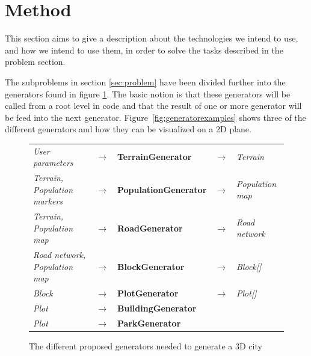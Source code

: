 \section{Method}
This section aims to give a description about the technologies we intend to use, and how we intend to use them, in order to solve the tasks described in the problem section.

The subproblems in section \ref{sec:problem} have been divided further into the generators found in figure \ref{fig:generators}. 
The basic notion is that these generators will be called from a root level in code and that the result of one or more generator will be feed into the next generator.
Figure~\ref{fig:generatorexamples} shows three of the different generators and how they can be visualized on a 2D plane. 

\begin{center}
  \begin{figure}[H]
    \begin{center}
      \begin{table}[H]
        \begin{tabular}{lllll}
          \textit{User parameters}              & $\rightarrow$ & \textbf{TerrainGenerator}    & $\rightarrow$ & \textit{Terrain}        \\
          \textit{Terrain, Population markers}  & $\rightarrow$ & \textbf{PopulationGenerator} & $\rightarrow$ & \textit{Population map} \\
          \textit{Terrain, Population map}      & $\rightarrow$ & \textbf{RoadGenerator}       & $\rightarrow$ & \textit{Road network}   \\
          \textit{Road network, Population map} & $\rightarrow$ & \textbf{BlockGenerator}      & $\rightarrow$ & \textit{Block{[}{]}}    \\
          \textit{Block}                        & $\rightarrow$ & \textbf{PlotGenerator}       & $\rightarrow$ & \textit{Plot{[}{]}}     \\
          \textit{Plot}                         & $\rightarrow$ & \textbf{BuildingGenerator}   &               &                         \\
          \textit{Plot}                         & $\rightarrow$ & \textbf{ParkGenerator}       &               &                        
        \end{tabular}
      \end{table}
    \end{center}
    \caption[]{The different proposed generators needed to generate a 3D city}
    \label{fig:generators}
  \end{figure}
\end{center}

